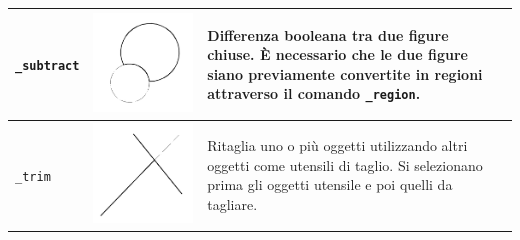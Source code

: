 \documentclass[..]{../IEEEphot}
\begin{document}
\begin{center}
\begin{longtable}{m{.2\linewidth}m{.2\linewidth}m{.25\linewidth}m{.25\linewidth}}
\texttt{\_subtract} & \includegraphics[width = 0.8\linewidth, keepaspectratio]{../images/jpg/_subtract.jpg} & Differenza booleana tra due figure chiuse. È necessario che le due figure siano previamente convertite in regioni attraverso il comando \texttt{\_region}. & 
\\
\midrule
\texttt{\_trim} & \includegraphics[width = 0.8\linewidth, keepaspectratio]{../images/jpg/_trim.jpg} & Ritaglia uno o più oggetti utilizzando altri oggetti come utensili di taglio. Si selezionano prima gli oggetti utensile e poi quelli da tagliare.  & 
\\	
\midrule

\end{longtable}
\end{center}
\end{document}
